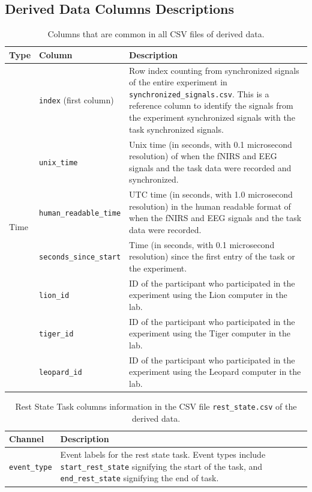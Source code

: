\subsection{Derived Data Columns Descriptions}
\label{sec:derived_data_cols_desc}


\begin{table}[h]
\centering
\begin{tabularx}{\textwidth}{|l|l|X|}
\hline
\textbf{Type} & \textbf{Column} & \textbf{Description} \\
\hline
\multirow{13}{*}{\parbox{2cm}{Time}}
& \texttt{index} (first column) & Row index counting from synchronized signals of the entire experiment in \texttt{synchronized\_signals.csv}. This is a reference column to identify the signals from the experiment synchronized signals with the task synchronized signals.\\
& \texttt{unix\_time} & Unix time (in seconds, with 0.1 microsecond resolution) of when the fNIRS and EEG signals and the task data were recorded and synchronized.\\
& \texttt{human\_readable\_time} & UTC time (in seconds, with 1.0 microsecond resolution) in the human readable format of when the fNIRS and EEG signals and the task data were recorded.\\
& \texttt{seconds\_since\_start} & Time (in seconds, with 0.1 microsecond resolution) since the first entry of the task or the experiment.\\
\hline
\multirow{6}{*}{\parbox{2cm}{Subject ID}}
& \texttt{lion\_id} & ID of the participant who participated in the experiment using the Lion computer in the lab.\\
& \texttt{tiger\_id} & ID of the participant who participated in the experiment using the Tiger computer in the lab.\\
& \texttt{leopard\_id} & ID of the participant who participated in the experiment using the Leopard computer in the lab.\\
\hline
\end{tabularx}
\caption{Columns that are common in all CSV files of derived data.}
\label{tab:shared_columns}
\end{table}

\begin{table}[h]
\centering
\begin{tabularx}{\textwidth}{|l|X|}
\hline
\textbf{Channel} & \textbf{Description} \\
\hline
\texttt{event\_type} & Event labels for the rest state task. Event types include \texttt{start\_rest\_state} signifying the start of the task, and \texttt{end\_rest\_state} signifying the end of task.\\
\hline
\end{tabularx}
\caption{Rest State Task columns information in the CSV file \texttt{rest\_state.csv} of the derived data.}
\label{tab:rest_task_columns}
\end{table}

